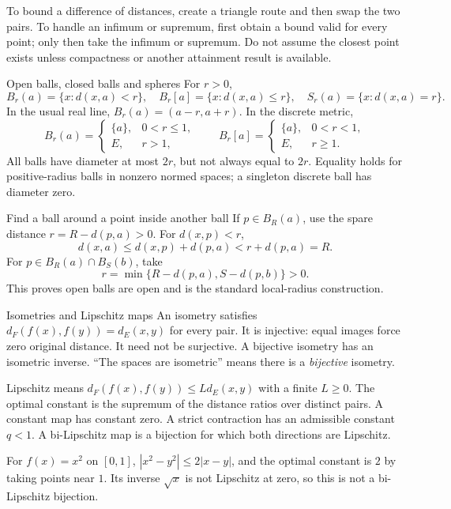\begin{tip}
To bound a difference of distances, create a triangle route and then swap the two pairs. To handle an infimum or supremum, first obtain a bound valid for every point; only then take the infimum or supremum. Do not assume the closest point exists unless compactness or another attainment result is available.
\end{tip}


\begin{note}{Open balls, closed balls and spheres}
For $r>0$,
\[B_r(a)=\{x:d(x,a)<r\},\quad B_r[a]=\{x:d(x,a)\le r\},\quad S_r(a)=\{x:d(x,a)=r\}.\]
In the usual real line, $B_r(a)=(a-r,a+r)$. In the discrete metric,
\[B_r(a)=\begin{cases}\{a\},&0<r\le1,\\E,&r>1,\end{cases}\qquad B_r[a]=\begin{cases}\{a\},&0<r<1,\\E,&r\ge1.\end{cases}\]
All balls have diameter at most $2r$, but not always equal to $2r$. Equality holds for positive-radius balls in nonzero normed spaces; a singleton discrete ball has diameter zero.
\end{note}
\begin{method}{Find a ball around a point inside another ball}
If $p\in B_R(a)$, use the spare distance $r=R-d(p,a)>0$. For $d(x,p)<r$,
\[d(x,a)\le d(x,p)+d(p,a)<r+d(p,a)=R.\]
For $p\in B_R(a)\cap B_S(b)$, take
\[r=\min\{R-d(p,a),S-d(p,b)\}>0.\]
This proves open balls are open and is the standard local-radius construction.
\end{method}
\begin{note}{Isometries and Lipschitz maps}
An isometry satisfies $d_F(f(x),f(y))=d_E(x,y)$ for every pair. It is injective: equal images force zero original distance. It need not be surjective. A bijective isometry has an isometric inverse. ``The spaces are isometric'' means there is a \emph{bijective} isometry.

Lipschitz means $d_F(f(x),f(y))\le Ld_E(x,y)$ with a finite $L\ge0$. The optimal constant is the supremum of the distance ratios over distinct pairs. A constant map has constant zero. A strict contraction has an admissible constant $q<1$. A bi-Lipschitz map is a bijection for which both directions are Lipschitz.

For $f(x)=x^2$ on $[0,1]$, $|x^2-y^2|\le2|x-y|$, and the optimal constant is $2$ by taking points near $1$. Its inverse $\sqrt{x}$ is not Lipschitz at zero, so this is not a bi-Lipschitz bijection.
\end{note}
